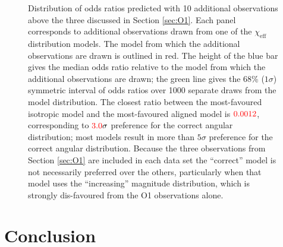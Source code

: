 \documentclass[modern]{aastex61}
\newcommand{\chieff}{\chi_\mathrm{eff}}
\newcommand{\checkme}[1]{\textcolor{red}{#1}}
\newcommand{\OTwoSigmaIsoAlignedMin}{\checkme{3.0}}
\newcommand{\OTwoOddsIsoAlignedMin}{\checkme{0.0012}}
\begin{document}
\begin{figure}
  \caption{\label{fig:O2-predictions} Distribution of odds ratios
    predicted with 10 additional observations above the three
    discussed in Section \ref{sec:O1}.  Each panel corresponds to
    additional observations drawn from one of the $\chieff$
    distribution models.  The model from which the additional
    observations are drawn is outlined in red.  The height of the blue
    bar gives the median odds ratio relative to the model from which
    the additional observations are drawn; the green line gives the
    68\% ($1 \sigma$) symmetric interval of odds ratios over 1000
    separate draws from the model distribution.  The closest ratio
    between the most-favoured isotropic model and the most-favoured
    aligned model is $\OTwoOddsIsoAlignedMin$, corresponding to
    $\OTwoSigmaIsoAlignedMin\sigma$ preference for the correct angular
    distribution; most models result in more than $5\sigma$ preference
    for the correct angular distribution.  Because the three
    observations from Section \ref{sec:O1} are included in each data
    set the ``correct'' model is not necessarily preferred over the
    others, particularly when that model uses the ``increasing''
    magnitude distribution, which is strongly dis-favoured from the O1
    observations alone.}
\end{figure}

\section{Conclusion}


\end{document}
